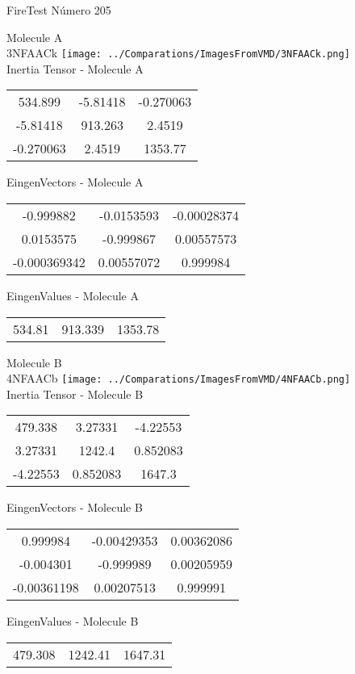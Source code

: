 \vtab[-2cm]
\begin{center}
{\large FireTest \tab Número 205}
\end{center}
\begin{multicols}{2}
\begin{center}

Molecule A \\ 
3NFAACk
\texttt{[image: ../Comparations/ImagesFromVMD/3NFAACk.png]}
\\
Inertia Tensor - Molecule A \\
\vtab

\begin{tabular}{|c c c|}
534.899	 & 	-5.81418	 & 	-0.270063	 \\
-5.81418	 & 	913.263	 & 	2.4519	 \\
-0.270063	 & 	2.4519	 & 	1353.77
\end{tabular}

\vtab
 EingenVectors - Molecule A     \\
\vtab
\begin{tabular}{|c c c|}
-0.999882	 & 	-0.0153593	 & 	-0.00028374	 \\
0.0153575	 & 	-0.999867	 & 	0.00557573	 \\
-0.000369342	 & 	0.00557072	 & 	0.999984
\end{tabular}

\vtab
 EingenValues - Molecule A     \\
\vtab
\begin{tabular}{|c c c|}
534.81	 & 	913.339	 & 	1353.78	 \\
\end{tabular}
\columnbreak

Molecule B \\ 
4NFAACb
\texttt{[image: ../Comparations/ImagesFromVMD/4NFAACb.png]}
\\
Inertia Tensor - Molecule B \\
\vtab

\begin{tabular}{|c c c|}
479.338	 & 	3.27331	 & 	-4.22553	 \\
3.27331	 & 	1242.4	 & 	0.852083	 \\
-4.22553	 & 	0.852083	 & 	1647.3
\end{tabular}

\vtab
 EingenVectors - Molecule B     \\
\vtab
\begin{tabular}{|c c c|}
0.999984	 & 	-0.00429353	 & 	0.00362086	 \\
-0.004301	 & 	-0.999989	 & 	0.00205959	 \\
-0.00361198	 & 	0.00207513	 & 	0.999991
\end{tabular}

\vtab
 EingenValues - Molecule B     \\
\vtab
\begin{tabular}{|c c c|}
479.308	 & 	1242.41	 & 	1647.31	 \\
\end{tabular}

\end{center}
\end{multicols}
